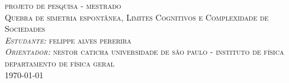 \documentclass[12pt]{article}
\begin{document}
\begin{titlepage}
\begin{center}
\textsc{\Large projeto de pesquisa - mestrado\\}
\textsc{\Huge Quebra de simetria espontânea, Limites Cognitivos e  Complexidade de Sociedades}\\[0.5cm]
\textsc{\small {\it Estudante:} felippe alves pererira\\ {\it Orientador:} nestor caticha}
\vfill
\textsc{universidade de são paulo - instituto de física}\\
\textsc{\small departamento de física geral}\\
\small \today
\end{center}
\end{titlepage}

\tableofcontents
\thispagestyle{empty}
\end{document}
